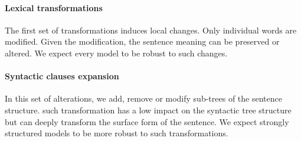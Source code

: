 
\paragraph{Lexical transformations} The first set of transformations induces local changes. Only individual words are modified. Given the modification, the sentence meaning can be preserved or altered. We expect every model to be robust to such changes. 


\paragraph{Syntactic clauses expansion} In this set of alterations, we add, remove or modify sub-trees of the sentence structure. such transformation has a low impact on the syntactic tree structure but can deeply transform the surface form of the sentence. We expect strongly structured models to be more robust to such transformations.


